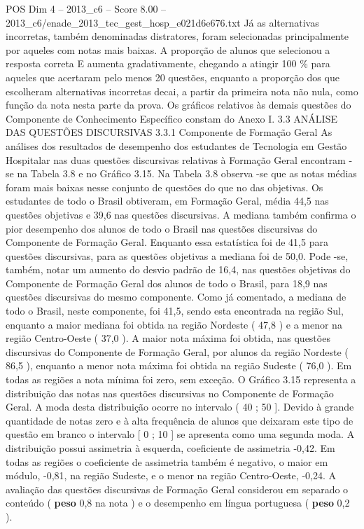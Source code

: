 \begin{textsample}{POS Dim 4 – 2013\_c6 – Score 8.00 – 2013\_c6/enade\_2013\_tec\_gest\_hosp\_e021d6e676.txt}
Já as alternativas incorretas, também denominadas distratores, foram selecionadas principalmente por aqueles com notas mais baixas.
A proporção de alunos que selecionou a resposta correta E aumenta gradativamente, chegando a atingir 100 \% para aqueles que acertaram pelo menos 20 questões, enquanto a proporção dos que escolheram alternativas incorretas decai, a partir da primeira nota não nula, como função da nota nesta parte da prova.
Os gráficos relativos às demais questões do Componente de Conhecimento Específico constam do Anexo I. 3.3 ANÁLISE DAS QUESTÕES DISCURSIVAS 3.3.1 Componente de Formação Geral As análises dos resultados de desempenho dos estudantes de Tecnologia em Gestão Hospitalar nas duas questões discursivas relativas à Formação Geral encontram -se na Tabela 3.8 e no Gráfico 3.15.
Na Tabela 3.8 observa -se que as notas médias foram mais baixas nesse conjunto de questões do que no das objetivas.
Os estudantes de todo o Brasil obtiveram, em Formação Geral, média 44,5 nas questões objetivas e 39,6 nas questões discursivas.
A mediana também confirma o pior desempenho dos alunos de todo o Brasil nas questões discursivas do Componente de Formação Geral.
Enquanto essa estatística foi de 41,5 para questões discursivas, para as questões objetivas a mediana foi de 50,0.
Pode -se, também, notar um aumento do desvio padrão de 16,4, nas questões objetivas do Componente de Formação Geral dos alunos de todo o Brasil, para 18,9 nas questões discursivas do mesmo componente.
Como já comentado, a mediana de todo o Brasil, neste componente, foi 41,5, sendo esta encontrada na região Sul, enquanto a maior mediana foi obtida na região Nordeste ( 47,8 ) e a menor na região Centro-Oeste ( 37,0 ).
A maior nota máxima foi obtida, nas questões discursivas do Componente de Formação Geral, por alunos da região Nordeste ( 86,5 ), enquanto a menor nota máxima foi obtida na região Sudeste ( 76,0 ).
Em todas as regiões a nota mínima foi zero, sem exceção.
O Gráfico 3.15 representa a distribuição das notas nas questões discursivas no Componente de Formação Geral.
A moda desta distribuição ocorre no intervalo ( 40 ; 50 ].
Devido à grande quantidade de notas zero e à alta frequência de alunos que deixaram este tipo de questão em branco o intervalo [ 0 ; 10 ] se apresenta como uma segunda moda.
A distribuição possui assimetria à esquerda, coeficiente de assimetria -0,42.
Em todas as regiões o coeficiente de assimetria também é negativo, o maior em módulo, -0,81, na região Sudeste, e o menor na região Centro-Oeste, -0,24.
A avaliação das questões discursivas de Formação Geral considerou em separado o conteúdo ( \textbf{peso} 0,8 na nota ) e o desempenho em língua portuguesa ( \textbf{peso} 0,2 ).

\end{textsample}
